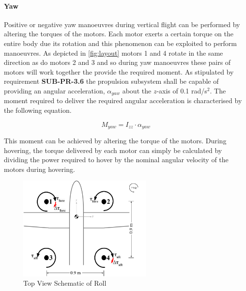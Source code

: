 \paragraph{Yaw}
Positive or negative yaw manoeuvres during vertical flight can be performed by altering the torques of the motors. Each motor exerts a certain torque on the entire body due its rotation and this phenomenon can be exploited to perform manoeuvres. As depicted in \autoref{fig:layout} motors 1 and 4 rotate in the same direction as do motors 2 and 3 and so during yaw manoeuvres these pairs of motors will work together the provide the required moment. As stipulated by requirement \textbf{SUB-PR-3.6} the propulsion subsystem shall be capable of providing an angular acceleration, $\alpha_{yaw}$ about the $z$-axis of 0.1 rad/s$^2$. The moment required to deliver the required angular acceleration is characterised by the following equation.


\begin{equation}
\label{eq:requ_mome_yaw}
M_{yaw} = I_{zz} \cdot \alpha_{yaw}
\end{equation}


This moment can be achieved by altering the torque of the motors. During hovering, the torque delivered by each motor can simply be calculated by dividing the power required to hover by the nominal angular velocity of the motors during hovering. 

\begin{figure}[htb]
    \centering
    \includegraphics[width=0.6\textwidth]{StabilityandControl/Figures/Top_view_control.png}
    \caption{Top View Schematic of Roll}
    \label{fig:schematic_top}
\end{figure}

